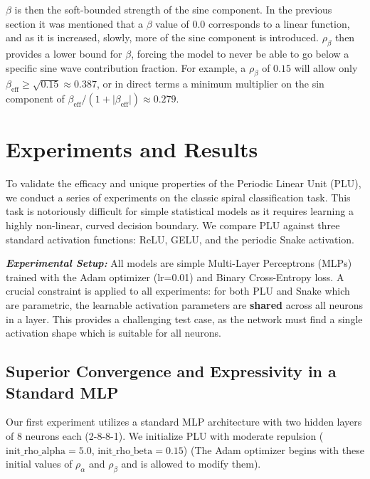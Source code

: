 \documentclass[11pt, letterpaper]{article}
\begin{document}
$\beta$ is then the soft-bounded strength of the sine component. In the previous section it was mentioned that a $\beta$ value of $0.0$ corresponds to a linear function, and as it is increased, slowly, more of the sine component is introduced. $\rho_\beta$ then provides a lower bound for $\beta$, forcing the model to never be able to go below a specific sine wave contribution fraction. For example, a $\rho_\beta$ of $0.15$ will allow only $\beta_{\text{eff}} \ge \sqrt{0.15} \approx 0.387$, or in direct terms a minimum multiplier on the sin component of $\beta_{\text{eff}} / (1 + \lvert\beta_{\text{eff}}\rvert) \approx 0.279$.

\section{Experiments and Results}

To validate the efficacy and unique properties of the Periodic Linear Unit (PLU), we conduct a series of experiments on the classic spiral classification task. This task is notoriously difficult for simple statistical models as it requires learning a highly non-linear, curved decision boundary. We compare PLU against three standard activation functions: ReLU, GELU, and the periodic Snake activation.

\textit{\textbf{Experimental Setup:}} All models are simple Multi-Layer Perceptrons (MLPs) trained with the Adam optimizer (lr=0.01) and Binary Cross-Entropy loss. A crucial constraint is applied to all experiments: for both PLU and Snake which are parametric, the learnable activation parameters are \textbf{shared} across all neurons in a layer. This provides a challenging test case, as the network must find a single activation shape which is suitable for all neurons.

\subsection{Superior Convergence and Expressivity in a Standard MLP}

Our first experiment utilizes a standard MLP architecture with two hidden layers of 8 neurons each (2-8-8-1). We initialize PLU with moderate repulsion ($\text{init\_rho\_alpha}=5.0$, $\text{init\_rho\_beta}=0.15$) (The Adam optimizer begins with these initial values of $\rho_\alpha$ and $\rho_\beta$ and is allowed to modify them).
\end{document}
